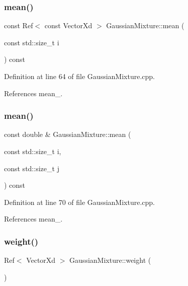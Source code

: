 \subsubsection{\texorpdfstring{mean()}{mean()}\hspace{0.1cm}{\footnotesize\ttfamily [5/6]}}
{\footnotesize\ttfamily const Ref$<$ const Vector\+Xd $>$ Gaussian\+Mixture\+::mean (\begin{DoxyParamCaption}\item[{const std\+::size\+\_\+t}]{i }\end{DoxyParamCaption}) const}



Definition at line 64 of file Gaussian\+Mixture.\+cpp.



References mean\+\_\+.

\mbox{\label{classbfl_1_1GaussianMixture_ac3baa237bc22f156f57d4c02deb4f518}} 
\subsubsection{\texorpdfstring{mean()}{mean()}\hspace{0.1cm}{\footnotesize\ttfamily [6/6]}}
{\footnotesize\ttfamily const double \& Gaussian\+Mixture\+::mean (\begin{DoxyParamCaption}\item[{const std\+::size\+\_\+t}]{i,  }\item[{const std\+::size\+\_\+t}]{j }\end{DoxyParamCaption}) const}



Definition at line 70 of file Gaussian\+Mixture.\+cpp.



References mean\+\_\+.

\mbox{\label{classbfl_1_1GaussianMixture_ada5625de6a3e2f98afb5aaa148503dad}} 
\subsubsection{\texorpdfstring{weight()}{weight()}\hspace{0.1cm}{\footnotesize\ttfamily [1/4]}}
{\footnotesize\ttfamily Ref$<$ Vector\+Xd $>$ Gaussian\+Mixture\+::weight (\begin{DoxyParamCaption}{ }\end{DoxyParamCaption})}



